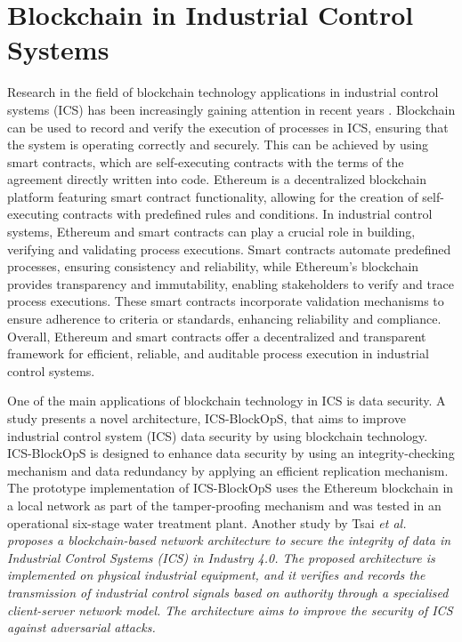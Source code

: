 \documentclass[conference]{IEEEtran}
\newcommand{\etal}{\it et al. \normalfont}
\begin{document}
\section{Blockchain in Industrial Control Systems}
\label{sec:Blockchain in ICS}

Research in the field of blockchain technology applications in industrial control systems (ICS)  has been increasingly gaining attention in recent years \cite{maw2019ics,tsai2022blockchain}. Blockchain can be used to record and verify the execution of processes in ICS, ensuring that the system is operating correctly and securely. This can be achieved by using smart contracts, which are self-executing contracts with the terms of the agreement directly written into code. Ethereum \cite{buterin2014nextgeneration} is a decentralized blockchain platform featuring smart contract functionality, allowing for the creation of self-executing contracts with predefined rules and conditions. In industrial control systems, Ethereum and smart contracts can play a crucial role in building, verifying and validating process executions. Smart contracts automate predefined processes, ensuring consistency and reliability, while Ethereum's blockchain provides transparency and immutability, enabling stakeholders to verify and trace process executions. These smart contracts incorporate validation mechanisms to ensure adherence to criteria or standards, enhancing reliability and compliance. Overall, Ethereum and smart contracts offer a decentralized and transparent framework for efficient, reliable, and auditable process execution in industrial control systems.

One of the main applications of blockchain technology in ICS is data security.  A study \cite{maw2019ics} presents a novel architecture, ICS-BlockOpS, that aims to improve industrial control system (ICS) data security by using blockchain technology. ICS-BlockOpS is designed to enhance data security by using an integrity-checking mechanism and data redundancy by applying an efficient replication mechanism. The prototype implementation of ICS-BlockOpS uses the Ethereum blockchain in a local network as part of the tamper-proofing mechanism and was tested in an operational six-stage water treatment plant. Another study by Tsai \etal \cite{tsai2022blockchain} proposes a blockchain-based network architecture to secure the integrity of data in Industrial Control Systems (ICS) in Industry 4.0. The proposed architecture is implemented on physical industrial equipment, and it verifies and records the transmission of industrial control signals based on authority through a specialised client-server network model. The architecture aims to improve the security of ICS against adversarial attacks. 
 
\end{document}
